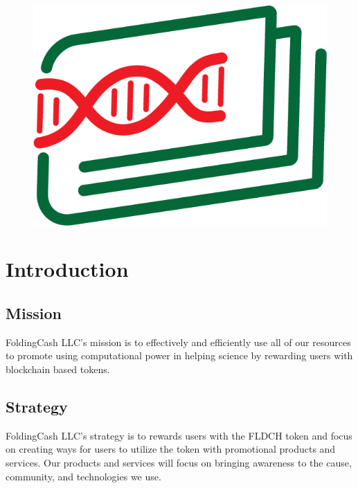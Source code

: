 \documentclass[letterpaper,12pt,titlepage]{article}
\title{\org}
\author{Miguel Molina Jr.}
\date{\today\\v0.1.0}
\def\org{FoldingCash LLC}
\def\ticker{FLDCH}
\begin{document}
\begin{figure}
    \centering
    \includegraphics[width=0.5\linewidth]{FoldingCash_Logo.png}
\end{figure}

\maketitle

\begin{abstract}
    The \org{} organization was created to incentivize Folding@Home's users to use their time, computer hardware, and electricity to continue and grow the amount of research that is being performed by Folding@Home. \org{} wants to incentivize users by leveraging a distributed and friction-less model like Folding@Home uses for their research. The \ticker{} token is built using BitcoinCash's CashTokens technology because we believe that BitcoinCash will continue to be an affordable blockchain to transact on and provides token technology as a first class citizen. \org{} will distribute the token but does not guarantee any return on a user's token earnings. However, instead our focus will be on providing utility to the token which we believe will increase people's desire to earn the token.
\end{abstract}

\section{Introduction}

\subsection{Mission}
\org{'s} mission is to effectively and efficiently use all of our resources to promote using computational power in helping science by rewarding users with blockchain based tokens.

\subsection{Strategy}
\org{'s} strategy is to rewards users with the \ticker{} token and focus on creating ways for users to utilize the token with promotional products and services. Our products and services will focus on bringing awareness to the cause, community, and technologies we use.
\end{document}
